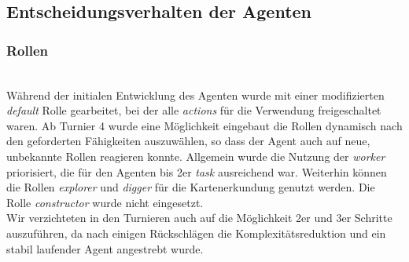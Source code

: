 \subsection{Entscheidungsverhalten der Agenten}

\subsubsection{Rollen} ~\\

Während der initialen Entwicklung des Agenten wurde mit einer modifizierten \textit{default} Rolle gearbeitet, bei der alle \textit{actions} für die Verwendung freigeschaltet waren. Ab Turnier 4 wurde eine Möglichkeit eingebaut die Rollen dynamisch nach den geforderten Fähigkeiten auszuwählen, so dass der Agent auch auf neue, unbekannte Rollen reagieren konnte. Allgemein wurde die Nutzung der \textit{worker} priorisiert, die für den Agenten bis 2er \textit{task} ausreichend war. Weiterhin können die Rollen  \textit{explorer} und  \textit{digger} für die Kartenerkundung genutzt werden. Die Rolle \textit{constructor} wurde nicht eingesetzt. \\

Wir verzichteten in den Turnieren auch auf die Möglichkeit 2er und 3er Schritte auszuführen, da nach einigen Rückschlägen die Komplexitätsreduktion und ein stabil laufender Agent angestrebt wurde.


